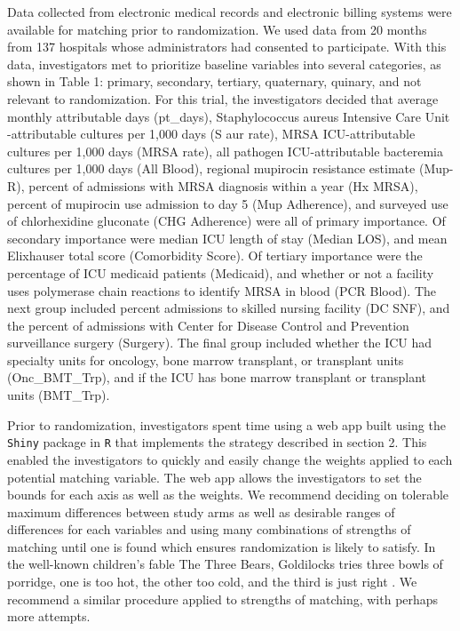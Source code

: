 \documentclass[]{article}
\begin{document}
Data collected from electronic medical records and electronic billing
systems were available for matching prior to randomization. We used data
from 20 months from 137 hospitals whose administrators had consented to
participate. With this data, investigators met to prioritize baseline
variables into several categories, as shown in Table 1: primary,
secondary, tertiary, quaternary, quinary, and not relevant to
randomization. For this trial, the investigators decided that average
monthly attributable days (pt\_days), Staphylococcus aureus Intensive
Care Unit -attributable cultures per 1,000 days (S aur rate), MRSA
ICU-attributable cultures per 1,000 days (MRSA rate), all pathogen
ICU-attributable bacteremia cultures per 1,000 days (All Blood),
regional mupirocin resistance estimate (Mup-R), percent of admissions
with MRSA diagnosis within a year (Hx MRSA), percent of mupirocin use
admission to day 5 (Mup Adherence), and surveyed use of chlorhexidine
gluconate (CHG Adherence) were all of primary importance. Of secondary
importance were median ICU length of stay (Median LOS), and mean
Elixhauser total score (Comorbidity Score). Of tertiary importance were
the percentage of ICU medicaid patients (Medicaid), and whether or not a
facility uses polymerase chain reactions to identify MRSA in blood (PCR
Blood). The next group included percent admissions to skilled nursing
facility (DC SNF), and the percent of admissions with Center for Disease
Control and Prevention surveillance surgery (Surgery). The final group
included whether the ICU had specialty units for oncology, bone marrow
transplant, or transplant units (Onc\_BMT\_Trp), and if the ICU has bone
marrow transplant or transplant units (BMT\_Trp).

Prior to randomization, investigators spent time using a web app built
using the \texttt{Shiny} package in \texttt{R} that implements the
strategy described in section 2. This enabled the investigators to
quickly and easily change the weights applied to each potential matching
variable. The web app allows the investigators to set the bounds for
each axis as well as the weights. We recommend deciding on tolerable
maximum differences between study arms as well as desirable ranges of
differences for each variables and using many combinations of strengths
of matching until one is found which ensures randomization is likely to
satisfy. In the well-known children's fable The Three Bears, Goldilocks
tries three bowls of porridge, one is too hot, the other too cold, and
the third is just right \citep{3Bears}. We recommend a similar procedure
applied to strengths of matching, with perhaps more attempts.
\end{document}
